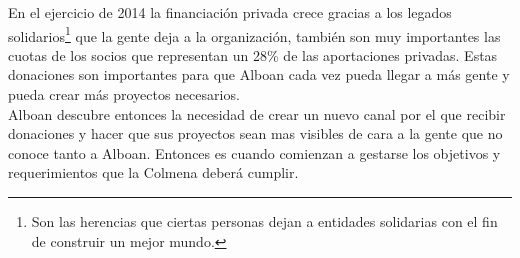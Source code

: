 En el ejercicio de 2014 la financiación privada crece gracias a los legados solidarios\footnote{Son las herencias que ciertas personas dejan a entidades solidarias con el fin de construir un mejor mundo.} que la gente deja a la organización, también son muy importantes las cuotas de los socios que representan un 28\% de las aportaciones privadas. Estas donaciones son importantes para que Alboan cada vez pueda llegar a más gente y pueda crear más proyectos necesarios.\\

Alboan descubre entonces la necesidad de crear un nuevo canal por el que recibir donaciones y hacer que sus proyectos sean mas visibles de cara a la gente que no conoce tanto a Alboan. Entonces es cuando comienzan a gestarse los objetivos y requerimientos que la Colmena deberá cumplir.\\


